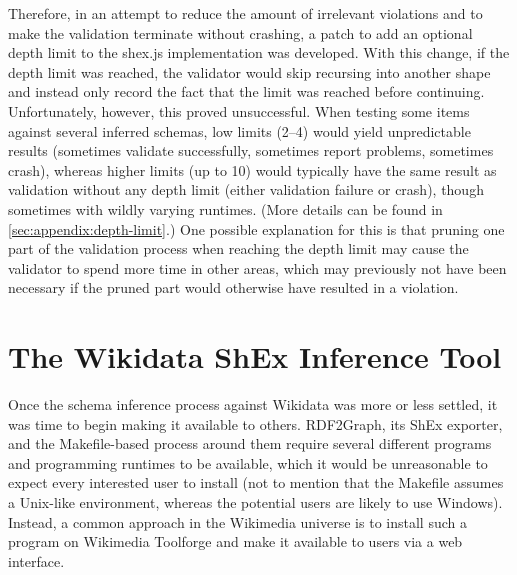 Therefore, %
in an attempt to reduce the amount of irrelevant violations
and to make the validation terminate without crashing,
a patch to add an optional depth limit to the shex.js implementation was developed.
With this change, if the depth limit was reached,
the validator would skip recursing into another shape
and instead only record the fact that the limit was reached before continuing.
Unfortunately, however, this proved unsuccessful.
When testing some items against several inferred schemas,
low limits (2–4) would yield unpredictable results
(sometimes validate successfully, sometimes report problems, sometimes crash),
whereas higher limits (up to 10) would typically have the same result as validation without any depth limit
(either validation failure or crash),
though sometimes with wildly varying runtimes.
(More details can be found in \cref{sec:appendix:depth-limit}.)
One possible explanation for this is that pruning one part of the validation process when reaching the depth limit
may cause the validator to spend more time in other areas,
which may previously not have been necessary if the pruned part would otherwise have resulted in a violation.


\chapter{The Wikidata ShEx Inference Tool}
\label{ch:wdsi}


Once the schema inference process against Wikidata was more or less settled,
it was time to begin making it available to others. %
RDF2Graph, its ShEx exporter, and the Makefile-based process around them
require several different programs and programming runtimes to be available,
which it would be unreasonable to expect every interested user to install
(not to mention that the Makefile assumes a Unix-like environment,
whereas the potential users are likely to use Windows).
Instead, a common approach in the Wikimedia universe
is to install such a program on Wikimedia Toolforge
and make it available to users via a web interface.

